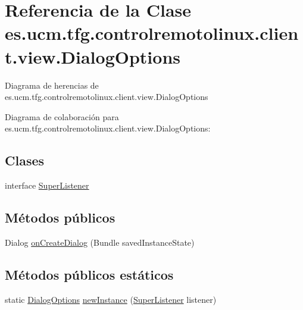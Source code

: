 \hypertarget{classes_1_1ucm_1_1tfg_1_1controlremotolinux_1_1client_1_1view_1_1DialogOptions}{\section{Referencia de la Clase es.\-ucm.\-tfg.\-controlremotolinux.\-client.\-view.\-Dialog\-Options}
\label{classes_1_1ucm_1_1tfg_1_1controlremotolinux_1_1client_1_1view_1_1DialogOptions}
}


Diagrama de herencias de es.\-ucm.\-tfg.\-controlremotolinux.\-client.\-view.\-Dialog\-Options


Diagrama de colaboración para es.\-ucm.\-tfg.\-controlremotolinux.\-client.\-view.\-Dialog\-Options\-:
\subsection*{Clases}
\begin{DoxyCompactItemize}
\item 
interface \hyperlink{interfacees_1_1ucm_1_1tfg_1_1controlremotolinux_1_1client_1_1view_1_1DialogOptions_1_1SuperListener}{Super\-Listener}
\end{DoxyCompactItemize}
\subsection*{Métodos públicos}
\begin{DoxyCompactItemize}
\item 
Dialog \hyperlink{classes_1_1ucm_1_1tfg_1_1controlremotolinux_1_1client_1_1view_1_1DialogOptions_a4880deae0c32fd7b9d8dc08b86027ef0}{on\-Create\-Dialog} (Bundle saved\-Instance\-State)
\end{DoxyCompactItemize}
\subsection*{Métodos públicos estáticos}
\begin{DoxyCompactItemize}
\item 
static \hyperlink{classes_1_1ucm_1_1tfg_1_1controlremotolinux_1_1client_1_1view_1_1DialogOptions}{Dialog\-Options} \hyperlink{classes_1_1ucm_1_1tfg_1_1controlremotolinux_1_1client_1_1view_1_1DialogOptions_a6f0c1d554cceeed917af3b7e058c78d3}{new\-Instance} (\hyperlink{interfacees_1_1ucm_1_1tfg_1_1controlremotolinux_1_1client_1_1view_1_1DialogOptions_1_1SuperListener}{Super\-Listener} listener)
\end{DoxyCompactItemize}


